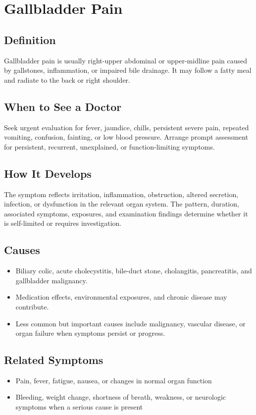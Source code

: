 \chapter{Gallbladder Pain}

\section*{Definition}
Gallbladder pain is usually right-upper abdominal or upper-midline pain caused by gallstones, inflammation, or impaired bile drainage. It may follow a fatty meal and radiate to the back or right shoulder.

\section*{When to See a Doctor}
Seek urgent evaluation for fever, jaundice, chills, persistent severe pain, repeated vomiting, confusion, fainting, or low blood pressure. Arrange prompt assessment for persistent, recurrent, unexplained, or function-limiting symptoms.

\section*{How It Develops}
The symptom reflects irritation, inflammation, obstruction, altered secretion, infection, or dysfunction in the relevant organ system. The pattern, duration, associated symptoms, exposures, and examination findings determine whether it is self-limited or requires investigation.

\section*{Causes}
\begin{itemize}
  \item Biliary colic, acute cholecystitis, bile-duct stone, cholangitis, pancreatitis, and gallbladder malignancy.
  \item Medication effects, environmental exposures, and chronic disease may contribute.
  \item Less common but important causes include malignancy, vascular disease, or organ failure when symptoms persist or progress.
\end{itemize}

\section*{Related Symptoms}
\begin{itemize}
  \item Pain, fever, fatigue, nausea, or changes in normal organ function
  \item Bleeding, weight change, shortness of breath, weakness, or neurologic symptoms when a serious cause is present
\end{itemize}

